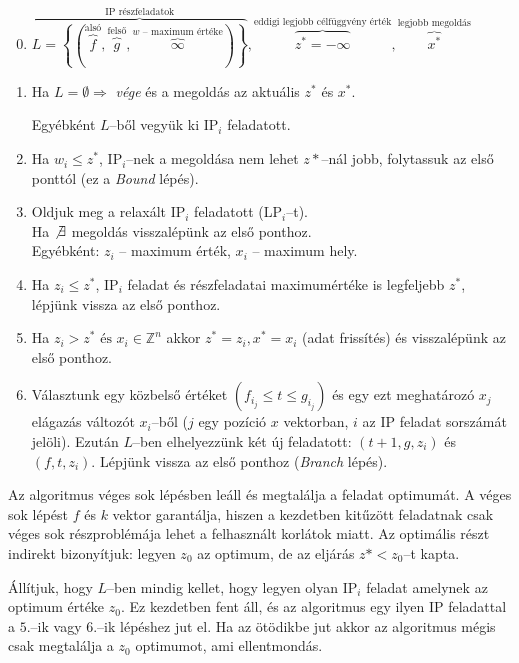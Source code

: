 \begin{enumerate}
  \setcounter{enumi}{-1}
  \item $\overbrace{L=\left\{ \left(
  \overbrace{f}^{\text{alsó}},\overbrace{g}^{\text{felső}},\overbrace{\infty}^{w
  \text{ -- maximum értéke}} \right) \right\}}^{\text{IP részfeladatok}},
  \overbrace{z^*=-\infty}^{\text{eddigi legjobb célfüggvény érték}},
  \overbrace{x^*}^{\text{legjobb megoldás}}$
  \item Ha $L=\emptyset \Rightarrow$ \emph{vége} és a megoldás az aktuális $z^*$
  és $x^*$.
  
  Egyébként $L$--ből vegyük ki IP$_i$ feladatott.
  \item Ha $w_i \leq z^*$, IP$_i$--nek a megoldása nem lehet $z*$--nál jobb,
  folytassuk az első ponttól (ez a \emph{Bound} lépés).
  \item Oldjuk meg a relaxált IP$_i$ feladatott (LP$_i$--t).
  \\ Ha $\not \exists$ megoldás visszalépünk az első ponthoz.
  \\ Egyébként: $z_i$ -- maximum érték,  $x_i$ -- maximum hely.
  \item Ha $z_i \leq z^*$, IP$_i$ feladat és részfeladatai maximumértéke is
  legfeljebb $z^*$, lépjünk vissza az első ponthoz.
  \item Ha $z_i > z^* \mbox{ és } x_i \in \mathbb{Z}^{n}$ akkor $ z^* = z_i, x^* =
  x_i$ (adat frissítés) és visszalépünk az első ponthoz.
  \item Választunk egy közbelső értéket $(f_{i_j} \leq t \leq g_{i_j})$ és egy
  ezt meghatározó $x_j$ elágazás változót $x_i$--ből ($j$ egy pozíció $x$
  vektorban, $i$ az IP feladat sorszámát jelöli). Ezután $L$--ben elhelyezzünk
  két új feladatott:  $(t+1, g, z_i)$ és $(f, t, z_i)$. Lépjünk vissza az első
  ponthoz (\emph{Branch} lépés).
\end{enumerate} 

Az algoritmus véges sok lépésben leáll és megtalálja a feladat optimumát. A
véges sok lépést $f$ és $k$ vektor garantálja, hiszen a kezdetben kitűzött
feladatnak csak véges sok részproblémája lehet a felhasznált korlátok miatt. Az
optimális részt indirekt bizonyítjuk: legyen $z_0$ az optimum, de az eljárás
$z*<z_0$--t kapta.

Állítjuk, hogy $L$--ben mindig kellet, hogy legyen olyan IP$_i$ feladat amelynek
az optimum értéke $z_0$. Ez kezdetben fent áll, és az algoritmus egy ilyen IP
feladattal a $5.$--ik vagy $6.$--ik lépéshez jut el. Ha az ötödikbe jut akkor az
algoritmus mégis csak megtalálja a $z_0$ optimumot, ami ellentmondás.

